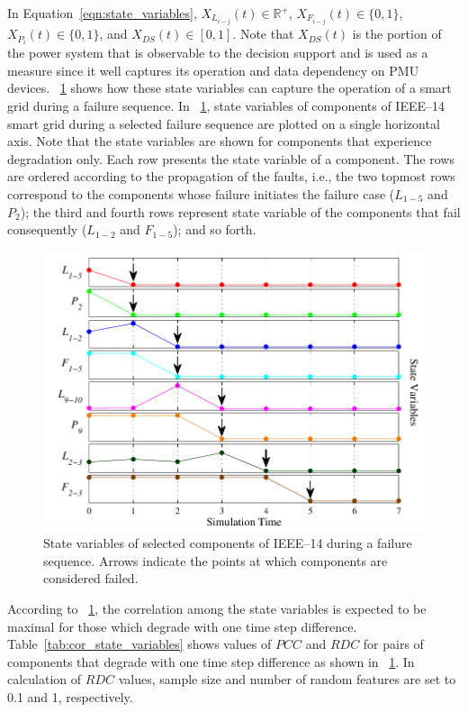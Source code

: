 \documentclass[12pt]{elsarticle}
\begin{document}
In Equation~\eqref{eqn:state_variables}, $X_{L_{i-j}}(t) \in \mathbb{R}^+$, $X_{F_{i-j}}(t)\in \{0, 1\}$, $X_{P_{i}}(t) \in \{0, 1\}$, and $X_{DS}(t) \in [0, 1]$. Note that $X_{DS}(t)$ is the portion of the power system that is observable to the decision support and is used as a measure since it well captures its operation and data dependency on PMU devices. \figurename~\ref{fig:state_variables} shows how these state variables can capture the operation of a smart grid during a failure sequence. In \figurename~\ref{fig:state_variables}, state variables of components of IEEE--14 smart grid during a selected failure sequence are plotted on a single horizontal axis. Note that the state variables are shown for components that experience degradation only. Each row presents the state variable of a component. The rows are ordered according to the propagation of the faults, i.e., the two topmost rows correspond to the components whose failure initiates the failure case ($L_{1-5}$ and $P_2$); the third and fourth rows represent state variable of the components that fail consequently ($L_{1-2}$ and $F_{1-5}$); and so forth.

\begin{figure}
\centering
\includegraphics[width=0.65\columnwidth]{state_variables}
\caption{State variables of selected components of IEEE--14 during a failure sequence. Arrows indicate the points at which components are considered failed.}
\label{fig:state_variables}
\end{figure}

According to \figurename~\ref{fig:state_variables}, the correlation among the state variables is expected to be maximal for those which degrade with one time step difference. Table~\ref{tab:cor_state_variables} shows values of $PCC$ and $RDC$ for pairs of components that degrade with one time step difference as shown in \figurename~\ref{fig:state_variables}. In calculation of $RDC$ values, sample size and number of random features are set to 0.1 and 1, respectively.
\end{document}
